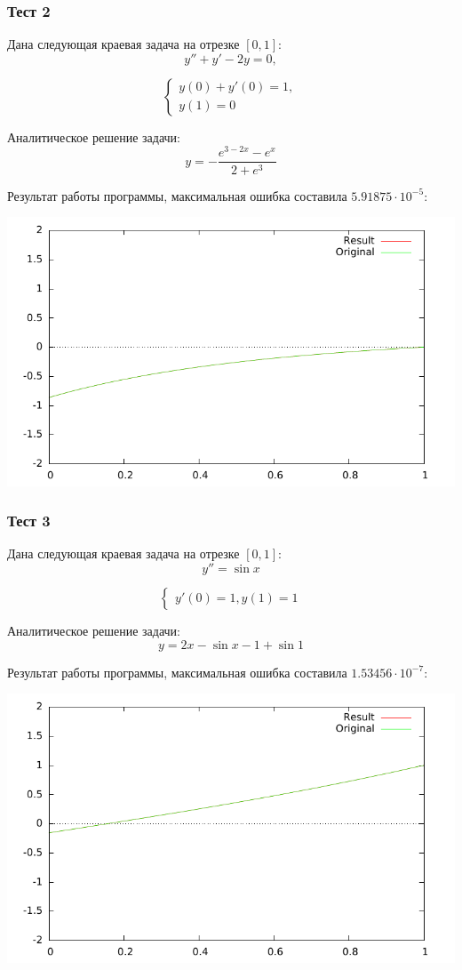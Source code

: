 \documentclass[a4paper,11pt]{report}
\begin{document}
\subsubsection*{Тест 2}

Дана следующая краевая задача на отрезке $[0, 1]$:
$$
y'' + y' - 2y = 0,
$$

$$
\begin{cases}
  y(0) + y'(0) = 1, \\
  y(1) = 0
\end{cases}
$$

Аналитическое решение задачи:
$$
y = -\frac{e^{3 - 2x} - e^x}{2 + e^3}
$$

Результат работы программы, максимальная ошибка составила $5.91875 \cdot 10^{-5}$:

\includegraphics{../plots/btest2.pdf}

\subsubsection*{Тест 3}

Дана следующая краевая задача на отрезке $[0, 1]$:
$$
y'' = \sin x
$$

$$
\begin{cases}
 y'(0) = 1,
 y(1) = 1
\end{cases}
$$

Аналитическое решение задачи:
$$
y = 2x - \sin x - 1 + \sin 1
$$

Результат работы программы, максимальная ошибка составила $1.53456 \cdot 10^{-7}$:

\includegraphics{../plots/btest3.pdf}
\end{document}
